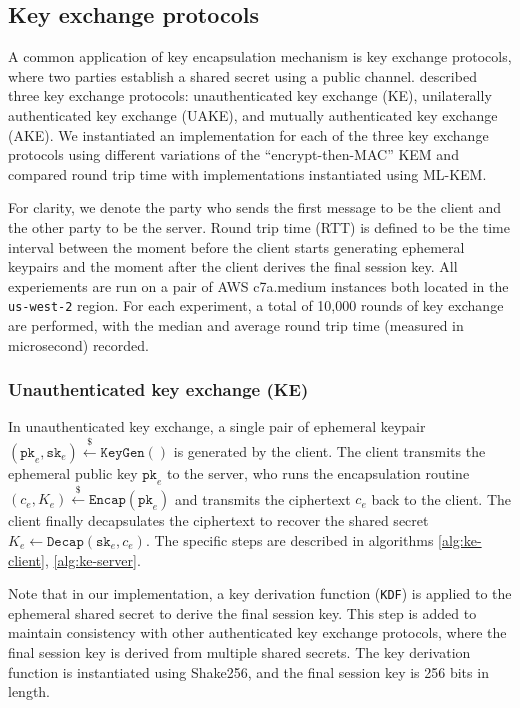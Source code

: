 \documentclass[floatrow,journal=tches,submission]{iacrtrans}
\newcommand{\keygen}{\texttt{KeyGen}}
\newcommand{\encap}{\texttt{Encap}}
\newcommand{\decap}{\texttt{Decap}}
\newcommand{\pk}{\texttt{pk}}
\newcommand{\sk}{\texttt{sk}}
\newcommand{\leftsample}{\stackrel{\$}{\leftarrow}}
\begin{document}
\subsection{Key exchange protocols}\label{sec:key-exchange-protocols}
A common application of key encapsulation mechanism is key exchange protocols, where two parties establish a shared secret using a public channel. \cite{bos2018crystals} described three key exchange protocols: unauthenticated key exchange (KE), unilaterally authenticated key exchange (UAKE), and mutually authenticated key exchange (AKE). We instantiated an implementation for each of the three key exchange protocols using different variations of the ``encrypt-then-MAC'' KEM and compared round trip time with implementations instantiated using ML-KEM.

For clarity, we denote the party who sends the first message to be the client and the other party to be the server. Round trip time (RTT) is defined to be the time interval between the moment before the client starts generating ephemeral keypairs and the moment after the client derives the final session key. All experiements are run on a pair of AWS c7a.medium instances both located in the \texttt{us-west-2} region. For each experiment, a total of 10,000 rounds of key exchange are performed, with the median and average round trip time (measured in microsecond) recorded.

\subsubsection{Unauthenticated key exchange (KE)}\label{sec:unauthenticated-key-exchange}
In unauthenticated key exchange, a single pair of ephemeral keypair $(\pk_e, \sk_e) \leftsample \keygen()$ is generated by the client. The client transmits the ephemeral public key $\pk_e$ to the server, who runs the encapsulation routine $(c_e, K_e) \leftsample \encap(\pk_e)$ and transmits the ciphertext $c_e$ back to the client. The client finally decapsulates the ciphertext to recover the shared secret $K_e \leftarrow \decap(\sk_e, c_e)$. The specific steps are described in algorithms \ref{alg:ke-client}, \ref{alg:ke-server}.

Note that in our implementation, a key derivation function (\texttt{KDF}) is applied to the ephemeral shared secret to derive the final session key. This step is added to maintain consistency with other authenticated key exchange protocols, where the final session key is derived from multiple shared secrets. The key derivation function is instantiated using Shake256, and the final session key is 256 bits in length.
\end{document}
